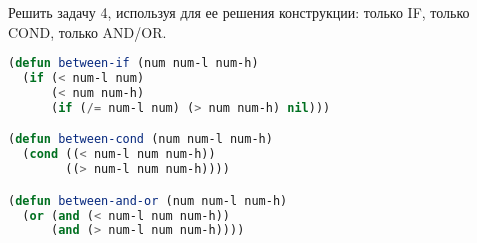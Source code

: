 Решить задачу 4, используя для ее решения конструкции: только IF, только COND,
только AND/OR.

\begin{lstlisting}[language=Lisp]
(defun between-if (num num-l num-h)
  (if (< num-l num)
      (< num num-h)
      (if (/= num-l num) (> num num-h) nil)))

(defun between-cond (num num-l num-h)
  (cond ((< num-l num num-h))
        ((> num-l num num-h))))

(defun between-and-or (num num-l num-h)
  (or (and (< num-l num num-h))
      (and (> num-l num num-h))))
\end{lstlisting}


